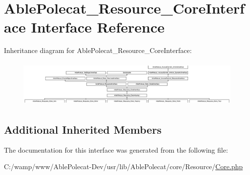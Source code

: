\hypertarget{interface_able_polecat___resource___core_interface}{}\section{Able\+Polecat\+\_\+\+Resource\+\_\+\+Core\+Interface Interface Reference}
\label{interface_able_polecat___resource___core_interface}
Inheritance diagram for Able\+Polecat\+\_\+\+Resource\+\_\+\+Core\+Interface\+:\begin{figure}[H]
\begin{center}
\leavevmode
\includegraphics[height=2.390244cm]{interface_able_polecat___resource___core_interface}
\end{center}
\end{figure}
\subsection*{Additional Inherited Members}


The documentation for this interface was generated from the following file\+:\begin{DoxyCompactItemize}
\item 
C\+:/wamp/www/\+Able\+Polecat-\/\+Dev/usr/lib/\+Able\+Polecat/core/\+Resource/\hyperlink{_core_8php}{Core.\+php}\end{DoxyCompactItemize}
